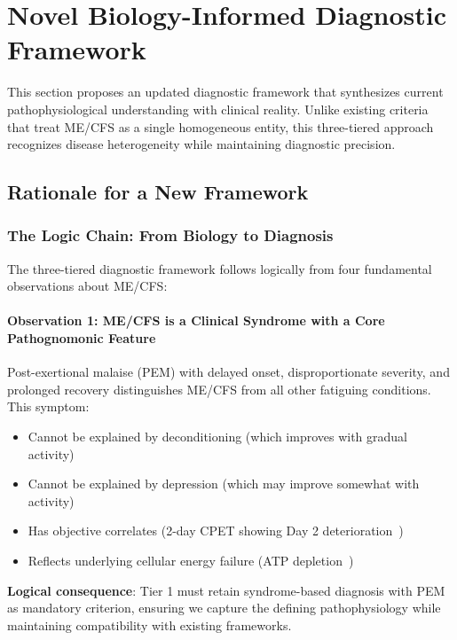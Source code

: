 \section{Novel Biology-Informed Diagnostic Framework}
\label{sec:novel-framework}

This section proposes an updated diagnostic framework that synthesizes current pathophysiological understanding with clinical reality. Unlike existing criteria that treat ME/CFS as a single homogeneous entity, this three-tiered approach recognizes disease heterogeneity while maintaining diagnostic precision.

\subsection{Rationale for a New Framework}
\label{subsec:framework-rationale}

\subsubsection{The Logic Chain: From Biology to Diagnosis}

The three-tiered diagnostic framework follows logically from four fundamental observations about ME/CFS:

\paragraph{Observation 1: ME/CFS is a Clinical Syndrome with a Core Pathognomonic Feature}

Post-exertional malaise (PEM) with delayed onset, disproportionate severity, and prolonged recovery distinguishes ME/CFS from all other fatiguing conditions. This symptom:
\begin{itemize}
    \item Cannot be explained by deconditioning (which improves with gradual activity)
    \item Cannot be explained by depression (which may improve somewhat with activity)
    \item Has objective correlates (2-day CPET showing Day 2 deterioration~\cite{Lim2020,keller2024cpet})
    \item Reflects underlying cellular energy failure (ATP depletion~\cite{heng2025mecfs,Syed2025})
\end{itemize}

\textbf{Logical consequence}: Tier 1 must retain syndrome-based diagnosis with PEM as mandatory criterion, ensuring we capture the defining pathophysiology while maintaining compatibility with existing frameworks.

